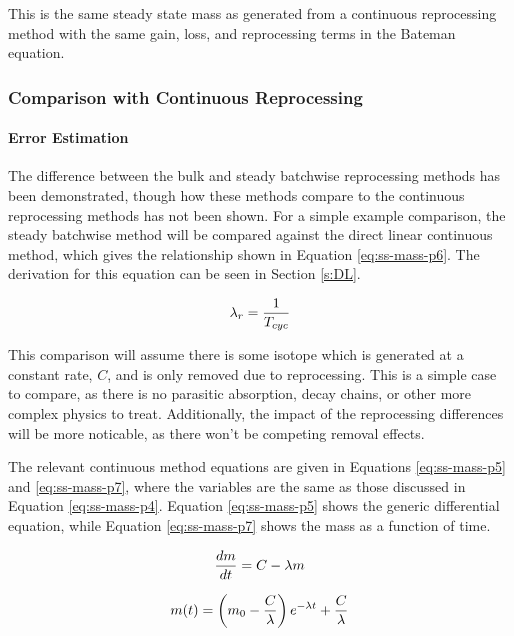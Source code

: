 This is the same steady state mass as generated from a continuous reprocessing method with the same gain, loss, and reprocessing terms in the Bateman equation.

\subsubsection{Comparison with Continuous Reprocessing}
\label{s:batch-cont-compare}

\paragraph*{Error Estimation}

The difference between the bulk and steady batchwise reprocessing methods has been demonstrated, though how these methods compare to the continuous reprocessing methods has not been shown. For a simple example comparison, the steady batchwise method will be compared against the direct linear continuous method, which gives the relationship shown in Equation \eqref{eq:ss-mass-p6}. The derivation for this equation can be seen in Section \ref{s:DL}.

\begin{equation} \hfill
\lambda_r = \frac{1}{T_{cyc}}
\hfill\label{eq:ss-mass-p6} \end{equation}

This comparison will assume there is some isotope which is generated at a constant rate, $C$, and is only removed due to reprocessing. This is a simple case to compare, as there is no parasitic absorption, decay chains, or other more complex physics to treat. Additionally, the impact of the reprocessing differences will be more noticable, as there won't be competing removal effects.


The relevant continuous method equations are given in Equations \eqref{eq:ss-mass-p5} and \eqref{eq:ss-mass-p7}, where the variables are the same as those discussed in Equation \eqref{eq:ss-mass-p4}. Equation \eqref{eq:ss-mass-p5} shows the generic differential equation, while Equation \eqref{eq:ss-mass-p7} shows the mass as a function of time.

\begin{equation} \hfill
\frac{dm}{dt} = C - \lambda m
\hfill\label{eq:ss-mass-p5} \end{equation}


\begin{equation} \hfill
m(t) = \left(m_0 - \frac{C}{\lambda} \right) e^{-\lambda t} + \frac{C}{\lambda}
\hfill\label{eq:ss-mass-p7} \end{equation}

